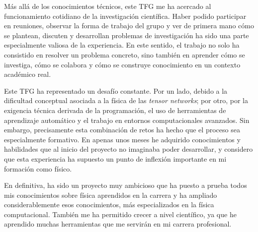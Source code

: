 Más allá de los conocimientos técnicos, este TFG me ha acercado al funcionamiento cotidiano de la investigación científica. Haber podido participar en reuniones, observar la forma de trabajo del grupo y ver de primera mano cómo se plantean, discuten y desarrollan problemas de investigación ha sido una parte especialmente valiosa de la experiencia. En este sentido, el trabajo no solo ha consistido en resolver un problema concreto, sino también en aprender cómo se investiga, cómo se colabora y cómo se construye conocimiento en un contexto académico real.

Este TFG ha representado un desafío constante. Por un lado, debido a la dificultad conceptual asociada a la física de las \textit{tensor networks}; por otro, por la exigencia técnica derivada de la programación, el uso de herramientas de aprendizaje automático y el trabajo en entornos computacionales avanzados. Sin embargo, precisamente esta combinación de retos ha hecho que el proceso sea especialmente formativo. En apenas unos meses he adquirido conocimientos y habilidades que al inicio del proyecto no imaginaba poder desarrollar, y considero que esta experiencia ha supuesto un punto de inflexión importante en mi formación como físico.

En definitiva, ha sido un proyecto muy ambicioso que ha puesto a prueba todos mis conocimientos sobre física aprendidos en la carrera y ha ampliado considerablemente esos conocimientos, más especializados en la física computacional. También me ha permitido crecer a nivel científico, ya que he aprendido muchas herramientas que me servirán en mi carrera profesional.